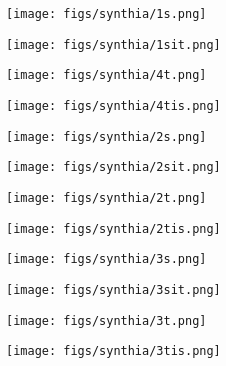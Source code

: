 \documentclass[letterpaper]{article} \usepackage[]{aaai23}  \usepackage{times}  \usepackage{helvet}  \usepackage{courier}  \usepackage[hyphens]{url}  \usepackage{graphicx} \urlstyle{rm} \def\UrlFont{\rm}  \usepackage{natbib}  \usepackage{caption} \frenchspacing  \setlength{\pdfpagewidth}{8.5in} \setlength{\pdfpageheight}{11in} \usepackage{algorithm}
\begin{document}
\begin{figure*}
    \centering
    \begin{subfigure}{0.24\linewidth}
        \centering
        \texttt{[image: figs/synthia/1s.png]}
    \end{subfigure}
    \begin{subfigure}{0.24\linewidth}
        \centering
        \texttt{[image: figs/synthia/1sit.png]}
    \end{subfigure}
    \begin{subfigure}{0.24\linewidth}
        \centering
        \texttt{[image: figs/synthia/4t.png]}
    \end{subfigure}
    \begin{subfigure}{0.24\linewidth}
        \centering
        \texttt{[image: figs/synthia/4tis.png]}
    \end{subfigure}
    
    \centering
    \begin{subfigure}{0.24\linewidth}
        \centering
        \texttt{[image: figs/synthia/2s.png]}
    \end{subfigure}
    \begin{subfigure}{0.24\linewidth}
        \centering
        \texttt{[image: figs/synthia/2sit.png]}
    \end{subfigure}
    \begin{subfigure}{0.24\linewidth}
        \centering
        \texttt{[image: figs/synthia/2t.png]}
    \end{subfigure}
    \begin{subfigure}{0.24\linewidth}
        \centering
        \texttt{[image: figs/synthia/2tis.png]}
    \end{subfigure}

    \centering
    \begin{subfigure}{0.24\linewidth}
        \centering
        \texttt{[image: figs/synthia/3s.png]}
    \end{subfigure}
    \begin{subfigure}{0.24\linewidth}
        \centering
        \texttt{[image: figs/synthia/3sit.png]}
    \end{subfigure}
        \begin{subfigure}{0.24\linewidth}
        \centering
        \texttt{[image: figs/synthia/3t.png]}
    \end{subfigure}
    \begin{subfigure}{0.24\linewidth}
        \centering
        \texttt{[image: figs/synthia/3tis.png]}
    \end{subfigure}
    

\end{figure*}
\end{document}
